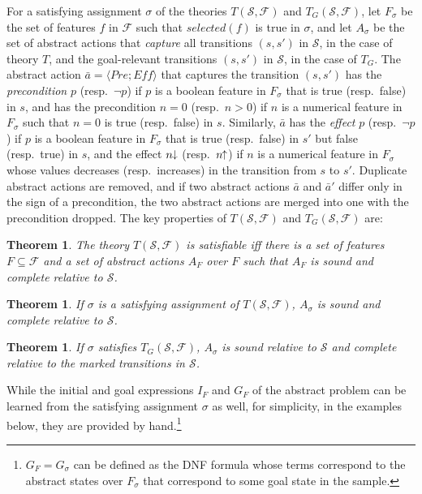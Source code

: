 \documentclass[letterpaper]{article} %
\newcommand{\tup}[1]{\langle #1 \rangle}
\newtheorem{theorem}[definition]{Theorem}
\newcommand{\F}{\mathcal{F}}
\renewcommand{\S}{\mathcal{S}}
\newcommand{\Eff}{{\mathit{Eff}}}
\newcommand{\abst}[2]{\tup{#1;#2}}
\newcommand{\pplus}{\hspace{-.05em}\raisebox{.15ex}{\footnotesize$\uparrow$}}
\newcommand{\mminus}{\hspace{-.05em}\raisebox{.15ex}{\footnotesize$\downarrow$}}
\begin{document}
For a satisfying assignment $\sigma$ of the theories $T(\S,\F)$ and $T_G(\S,\F)$, let
$F_{\sigma}$ be the set of features $f$ in $\F$ such that $selected(f)$
is true in $\sigma$, and let $A_{\sigma}$ be the set of abstract actions
that \emph{capture} all transitions $(s,s')$ in $\S$, in the case of theory $T$,
and the goal-relevant transitions $(s,s')$ in $\S$, in the case of $T_G$.
The abstract action $\bar{a}=\abst{Pre}{\Eff}$ that captures the transition $(s,s')$
has the \emph{precondition} $p$ (resp.\ $\neg p$) if $p$ is a boolean feature in
$F_{\sigma}$ that is true (resp.\ false) in $s$, and has the precondition $n=0$
(resp.\ $n > 0$) if $n$ is a numerical feature in $F_{\sigma}$ such that $n=0$
is true (resp.\ false) in $s$. Similarly, $\bar{a}$ has the \emph{effect} $p$
(resp.\ $\neg p$) if $p$ is a boolean feature in $F_{\sigma}$ that is true
(resp.\ false) in $s'$ but false (resp.\ true) in $s$, and the effect $n\mminus$
(resp.\ $n\pplus$) if $n$ is a numerical feature in $F_{\sigma}$ whose values
decreases (resp.\ increases) in the transition from $s$ to $s'$.
Duplicate abstract actions are removed, and if two abstract actions $\bar{a}$ and $\bar{a}'$
differ only in the sign of a precondition, the two abstract actions are    merged into one with
the precondition dropped. The key properties of $T(\S,\F)$ and $T_G(\S,\F)$ are:

\begin{theorem}
  The theory $T(\S,\F)$ is satisfiable iff there is a set of features $F \subseteq \F$
  and a set of abstract actions $A_F$ over $F$ such that $A_F$ is sound and complete relative to  $\S$.
\end{theorem}

\begin{theorem}
  If $\sigma$ is a satisfying assignment of $T(\S,\F)$,   $A_{\sigma}$ is sound and complete relative to $\S$.
\end{theorem}

\begin{theorem}
  If $\sigma$ satisfies  $T_G(\S,\F)$, $A_{\sigma}$  is sound relative to $\S$ and complete relative to the marked
  transitions in $\S$. 
\end{theorem}

While the initial and goal expressions $I_F$ and $G_F$ of the abstract problem can be learned 
from the satisfying assignment $\sigma$ as well, for simplicity, in the examples below, they are
provided by hand.\footnote{
$G_F = G_{\sigma}$ can be defined as the DNF formula whose terms 
correspond to the abstract states over 
$F_{\sigma}$ that correspond to some goal state in the sample.}
\end{document}
